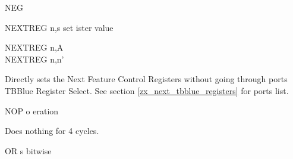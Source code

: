 \begin{basedescript}{
    \desclabelstyle{\multilinelabel}
    \desclabelwidth{3cm}}
\begin{DetailItem}{NEG}
        \begin{DetailEffects}[p]
            \FlagsNEG
        \end{DetailEffects}
				
        \begin{DetailTiming}
        \end{DetailTiming}

    \end{DetailItem}

    \begin{DetailItem}{\small NEXTREG n,s{\scriptsize \ZXN}}
        {set  ister value}
        {}

        \begin{DetailVariants}
            NEXTREG n,A\\
            NEXTREG n,n'
        \end{DetailVariants}

        Directly sets the Next Feature Control Registers without going through ports TBBlue Register Select. See section \ref{zx_next_tbblue_registers} for ports list.

        \begin{DetailEffects}
            \FlagsNEXTREGna
        \end{DetailEffects}		
		
        \begin{DetailTiming}
        \end{DetailTiming}

    \end{DetailItem}

    \begin{DetailItem}{NOP}
        {o eration}
        {}

        Does nothing for 4 cycles.
		
        \begin{DetailEffects}
            \FlagsNOP
        \end{DetailEffects}
						
        \begin{DetailTiming}
        \end{DetailTiming}

    \end{DetailItem}

    \begin{DetailItem}{OR s}
        {bitwise }
        {}


\end{DetailItem}
\end{basedescript}
